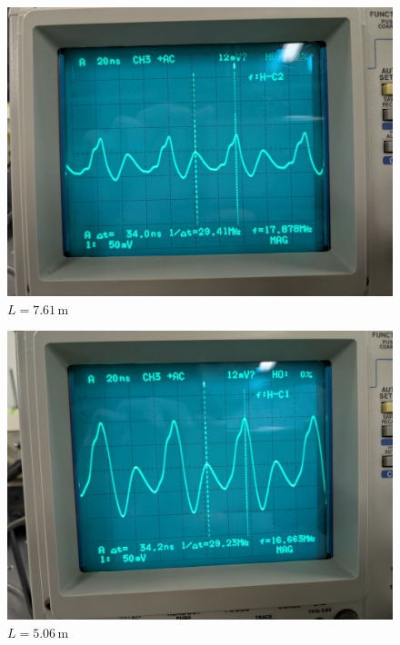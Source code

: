 \documentclass{jarticle}
\begin{document}
\begin{figure}[H]
  \begin{center}
    \includegraphics[scale=0.3]{cable2_result_picture.jpg}
    \caption{$L=7.61\,\mathrm{m}$}
  \end{center}
\end{figure}

\begin{figure}
  \begin{center}
    \includegraphics[scale=0.3]{cable3_result_picture.jpg}
    \caption{$L=5.06\,\mathrm{m}$}
  \end{center}
\end{figure}
\end{document}
